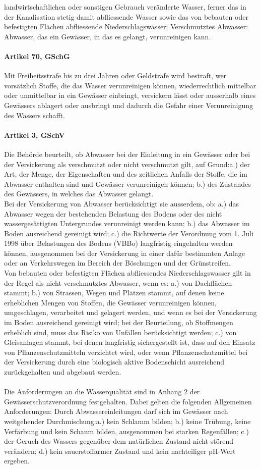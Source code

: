 \documentclass[9pt, openright=false]{scrartcl}
\begin{document}
landwirtschaftlichen oder sonstigen Gebrauch veränderte Wasser, ferner das in der Kanalisation stetig damit abfliessende Wasser sowie das von bebauten oder befestigten Flächen abfliessende Niederschlagswasser; Verschmutztes Abwasser: Abwasser, das ein Gewässer, in das es gelangt, verunreinigen kann.\paragraph{Artikel 70, GSchG} Mit Freiheitsstrafe bis zu drei Jahren oder Geldstrafe wird bestraft, wer vorsätzlich Stoffe, die das Wasser verunreinigen können, wiederrechtlich mittelbar oder unmittelbar in ein Gewässer einbringt, versickern lässt oder ausserhalb eines Gewässers ablagert oder ausbringt und dadurch die Gefahr einer Verunreinigung des Wassers schafft.\paragraph{Artikel 3, GSchV} Die Behörde beurteilt, ob Abwasser bei der Einleitung in ein Gewässer oder bei der Versickerung als verschmutzt oder nicht verschmutzt gilt, auf Grund:a.) der Art, der Menge, der Eigenschaften und des zeitlichen Anfalls der Stoffe, die im Abwasser enthalten sind und Gewässer verunreinigen können; b.) des Zustandes des Gewässers, in welches das Abwasser gelangt.\\ Bei der Versickerung von Abwasser berücksichtigt sie ausserdem, ob: a.) das Abwasser wegen der bestehenden Belastung des Bodens oder des nicht wassergesättigten Untergrundes verunreinigt werden kann; b.) das Abwasser im Boden ausreichend gereinigt wird; c.) die Richtwerte der Verordnung vom 1. Juli 1998 über Belastungen des Bodens (VBBo) langfristig eingehalten werden können, ausgenommen bei der Versickerung in einer dafür bestimmten Anlage oder an Verkehrswegen im Bereich der Böschungen und der Grünstreifen.\\ Von bebauten oder befestigten Flächen abfliessendes Niederschlagswasser gilt in der Regel als nicht verschmutztes Abwasser, wenn es: a.) von Dachflächen stammt; b.) von Strassen, Wegen und Plätzen stammt, auf denen keine erheblichen Mengen von Stoffen, die Gewässer verunreinigen können, umgeschlagen, verarbeitet und gelagert werden, und wenn es bei der Versickerung im Boden ausreichend gereinigt wird; bei der Beurteilung, ob Stoffmengen erheblich sind, muss das Risiko von Unfällen berücksichtigt werden; c.) von Gleisanlagen stammt, bei denen langfristig sichergestellt ist, dass auf den Einsatz von Pflanzenschutzmitteln verzichtet wird, oder wenn Pflanzenschutzmittel bei der Versickerung durch eine biologisch aktive Bodenschicht ausreichend zurückgehalten und abgebaut werden.\\ \\
Die Anforderungen an die Wasserqualität sind in Anhang 2 der Gewässerschutzverordnung festgehalten. Dabei gelten die folgenden Allgemeinen Anforderungen: Durch Abwassereinleitungen darf sich im Gewässer nach weitgehender Durchmischung:a.) kein Schlamm bilden; b.) keine Trübung, keine Verfärbung und kein Schaum bilden, ausgenommen bei starken Regenfällen; c.) der Geruch des Wassers gegenüber dem natürlichen Zustand nicht störend verändern; d.) kein sauerstoffarmer Zustand und kein nachteiliger pH-Wert ergeben.
\end{document}
